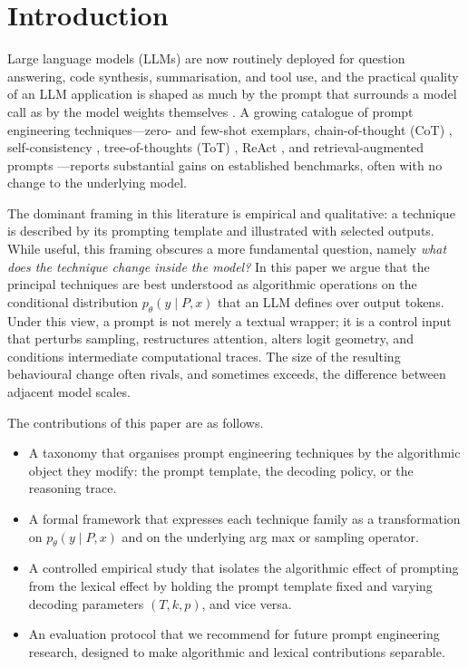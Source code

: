\documentclass[conference]{IEEEtran}
\begin{document}
\section{Introduction}
\label{sec:intro}

Large language models (LLMs) are now routinely deployed for question answering, code synthesis, summarisation, and tool use, and the practical quality of an LLM application is shaped as much by the prompt that surrounds a model call as by the model weights themselves \cite{b1,b2}. A growing catalogue of prompt engineering techniques---zero- and few-shot exemplars, chain-of-thought (CoT) \cite{b3}, self-consistency \cite{b4}, tree-of-thoughts (ToT) \cite{b5}, ReAct \cite{b6}, and retrieval-augmented prompts \cite{b7}---reports substantial gains on established benchmarks, often with no change to the underlying model.

The dominant framing in this literature is empirical and qualitative: a technique is described by its prompting template and illustrated with selected outputs. While useful, this framing obscures a more fundamental question, namely \textit{what does the technique change inside the model?} In this paper we argue that the principal techniques are best understood as algorithmic operations on the conditional distribution $p_\theta(y \mid P, x)$ that an LLM defines over output tokens. Under this view, a prompt is not merely a textual wrapper; it is a control input that perturbs sampling, restructures attention, alters logit geometry, and conditions intermediate computational traces. The size of the resulting behavioural change often rivals, and sometimes exceeds, the difference between adjacent model scales.

The contributions of this paper are as follows.

\begin{itemize}
    \item A taxonomy that organises prompt engineering techniques by the algorithmic object they modify: the prompt template, the decoding policy, or the reasoning trace.
    \item A formal framework that expresses each technique family as a transformation on $p_\theta(y \mid P, x)$ and on the underlying arg max or sampling operator.
    \item A controlled empirical study that isolates the algorithmic effect of prompting from the lexical effect by holding the prompt template fixed and varying decoding parameters $(T, k, p)$, and vice versa.
    \item An evaluation protocol that we recommend for future prompt engineering research, designed to make algorithmic and lexical contributions separable.
\end{itemize}
\end{document}
